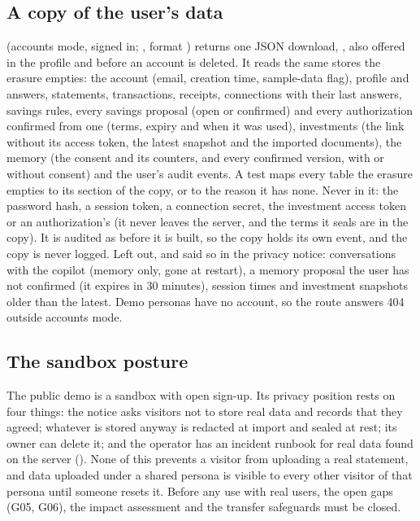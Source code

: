 \subsection{A copy of the user's data}\label{sec:export}

 (accounts mode, signed in; , format
) returns one JSON download, , also offered in the
profile and before an account is deleted. It reads the same stores the erasure empties: the account (email, creation
time, sample-data flag), profile and answers, statements, transactions, receipts, connections with their last answers,
savings rules, every savings proposal (open or confirmed) and every authorization confirmed from one (terms, expiry and
when it was used), investments (the link without its access token, the latest snapshot and the imported documents), the
memory (the consent and its counters, and every confirmed version, with or without consent) and the user's audit
events. A test maps every table the erasure empties to its section of the copy, or to the reason it has none. Never in
it: the password hash, a session token, a connection secret, the investment access token or an authorization's
 (it never leaves the server, and the terms it seals are in the copy). It is audited as
 before it is built, so the copy holds its own event, and the copy is never logged. Left out, and
said so in the privacy notice: conversations with the copilot (memory only, gone at restart), a memory proposal the
user has not confirmed (it expires in 30 minutes), session times and investment snapshots older than the latest. Demo
personas have no account, so the route answers 404 outside accounts mode.

\subsection{The sandbox posture}

The public demo is a sandbox with open sign-up. Its privacy position rests on four things: the notice asks visitors not
to store real data and records that they agreed; whatever is stored anyway is redacted at import and sealed at rest;
its owner can delete it; and the operator has an incident runbook for real data found on the server
(). None of this prevents a visitor from uploading a real statement, and data
uploaded under a shared persona is visible to every other visitor of that persona until someone resets it. Before any
use with real users, the open gaps (G05, G06), the impact assessment and the transfer safeguards must be closed.
